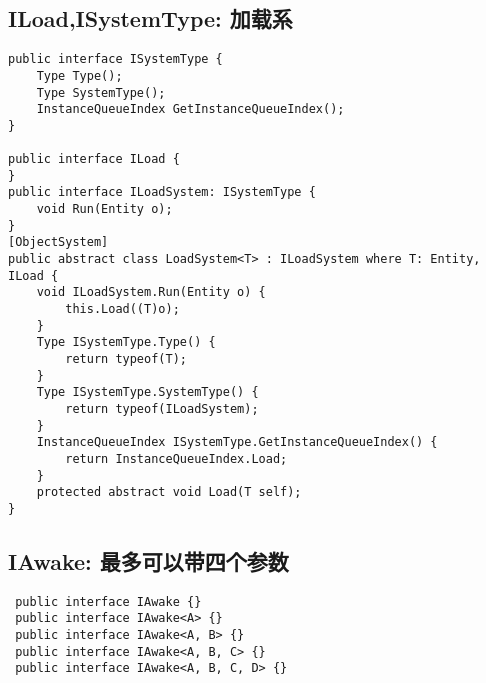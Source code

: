 \documentclass[9pt, b5paper]{article}
\begin{document}
\subsection{ILoad,ISystemType: 加载系}
\label{sec-2-5}
\begin{verbatim}
public interface ISystemType {
    Type Type();
    Type SystemType();
    InstanceQueueIndex GetInstanceQueueIndex();
}

public interface ILoad {
}
public interface ILoadSystem: ISystemType {
    void Run(Entity o);
}
[ObjectSystem]
public abstract class LoadSystem<T> : ILoadSystem where T: Entity, ILoad {
    void ILoadSystem.Run(Entity o) {
        this.Load((T)o);
    }
    Type ISystemType.Type() {
        return typeof(T);
    }
    Type ISystemType.SystemType() {
        return typeof(ILoadSystem);
    }
    InstanceQueueIndex ISystemType.GetInstanceQueueIndex() {
        return InstanceQueueIndex.Load;
    }
    protected abstract void Load(T self);
}
\end{verbatim}
\subsection{IAwake: 最多可以带四个参数}
\label{sec-2-6}
\begin{verbatim}
 public interface IAwake {}
 public interface IAwake<A> {}
 public interface IAwake<A, B> {}
 public interface IAwake<A, B, C> {}
 public interface IAwake<A, B, C, D> {}
\end{verbatim}
\end{document}

